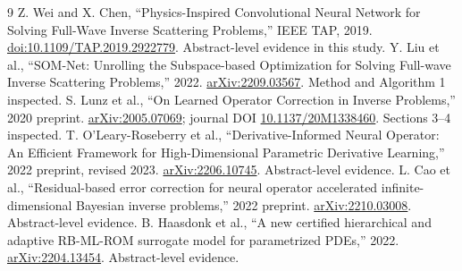 \documentclass[UTF8,11pt,a4paper,fontset=fandol]{ctexart}
\begin{document}
\begin{thebibliography}{9}
 Z. Wei and X. Chen, ``Physics-Inspired Convolutional Neural Network for Solving Full-Wave Inverse Scattering Problems,'' IEEE TAP, 2019. \href{https://doi.org/10.1109/TAP.2019.2922779}{doi:10.1109/TAP.2019.2922779}. Abstract-level evidence in this study.
 Y. Liu et al., ``SOM-Net: Unrolling the Subspace-based Optimization for Solving Full-wave Inverse Scattering Problems,'' 2022. \href{https://arxiv.org/abs/2209.03567}{arXiv:2209.03567}. Method and Algorithm 1 inspected.
 S. Lunz et al., ``On Learned Operator Correction in Inverse Problems,'' 2020 preprint. \href{https://arxiv.org/abs/2005.07069}{arXiv:2005.07069}; journal DOI \href{https://doi.org/10.1137/20M1338460}{10.1137/20M1338460}. Sections 3--4 inspected.
 T. O'Leary-Roseberry et al., ``Derivative-Informed Neural Operator: An Efficient Framework for High-Dimensional Parametric Derivative Learning,'' 2022 preprint, revised 2023. \href{https://arxiv.org/abs/2206.10745}{arXiv:2206.10745}. Abstract-level evidence.
 L. Cao et al., ``Residual-based error correction for neural operator accelerated infinite-dimensional Bayesian inverse problems,'' 2022 preprint. \href{https://arxiv.org/abs/2210.03008}{arXiv:2210.03008}. Abstract-level evidence.
 B. Haasdonk et al., ``A new certified hierarchical and adaptive RB-ML-ROM surrogate model for parametrized PDEs,'' 2022. \href{https://arxiv.org/abs/2204.13454}{arXiv:2204.13454}. Abstract-level evidence.
\end{thebibliography}
\end{document}
